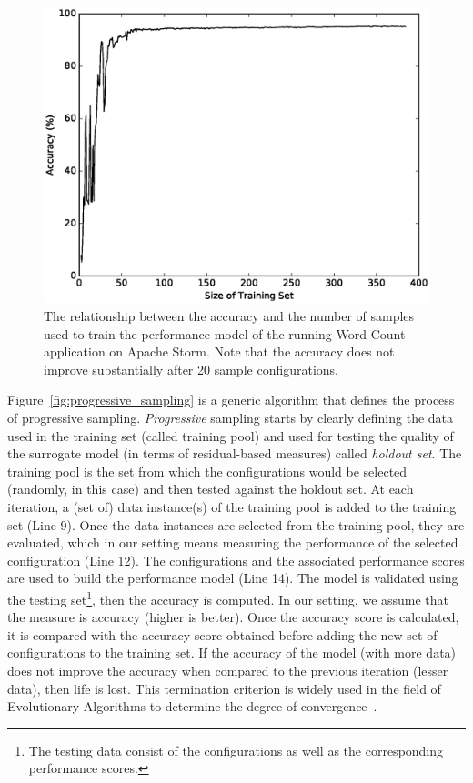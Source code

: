 \documentclass[10pt,journal,compsoc]{IEEEtran}
\begin{document}
\begin{figure}[t]
\centering
\includegraphics[scale=0.4]{Figures/figure1.eps}
\caption{{\small The relationship between the accuracy and the number of samples used to train the performance model of the running Word Count application on Apache Storm. Note that the accuracy does not improve substantially after 20 sample configurations.}
}
\label{fig:learning_curve}
\end{figure}





Figure~\ref{fig:progressive_sampling} is a generic algorithm that defines the process of progressive sampling. \emph{Progressive} sampling starts by clearly defining the data used in the training set (called training pool) and used for testing the quality of the surrogate model (in terms of residual-based measures) called \textit{holdout set}. The training pool is the set from which the configurations would be selected (randomly, in this case) and then tested against the holdout set. At each iteration, a (set of) data instance(s) of the training pool is added to the training set (Line 9). Once the data instances are selected from the training pool, they are evaluated, which in our setting means measuring the performance of the selected configuration (Line 12). The configurations and the associated performance scores are used to build the performance model (Line 14). The model is validated using the testing set\footnote{The testing data consist of the configurations as well as the corresponding performance scores.}, then the accuracy is computed. In our setting, we assume that the measure is accuracy (higher is better). Once the accuracy score is calculated, it is compared with the accuracy score obtained before adding the new set of configurations to the training set. If the accuracy of the model (with more data) does not improve the accuracy when compared to the previous iteration (lesser data), then life is lost. This termination criterion is widely used in the field of Evolutionary Algorithms to determine the degree of convergence~\cite{krall2015gale}.
\end{document}
